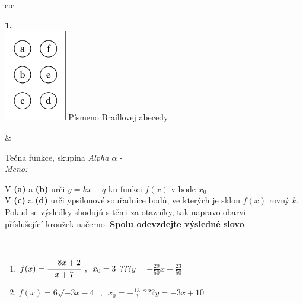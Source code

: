 \documentclass[10pt]{report}
\begin{document}
\begin{tabular}{c:c}
\begin{minipage}[c][104.5mm][t]{0.5\linewidth}
\begin{center}
\begin{minipage}{0.20\linewidth}
\begin{center}
{\Huge\bfseries 1.} \\[2mm]
\includegraphics[height=40mm]{../images/braille.png}
{\small Písmeno Braillovej abecedy}
\end{center}
\end{minipage}
\end{center}
\end{minipage}
&
\begin{minipage}[c][104.5mm][t]{0.5\linewidth}
\begin{center}
\vspace{7mm}
{\huge Tečna funkce, skupina \textit{Alpha $\alpha$} -}\\[5mm]
\textit{Meno:}\phantom{xxxxxxxxxxxxxxxxxxxxxxxxxxxxxxxxxxxxxxxxxxxxxxxxxxxxxxxxxxxxxxxxx}\\[5mm]
\begin{minipage}{0.95\linewidth}
\begin{center}
V \textbf{(a)} a \textbf{(b)} urči  $y = kx + q$ ku funkci $f(x)$ v bode $x_0$.\\V \textbf{(c)} a \textbf{(d)} urči ypsilonové souřadnice bodů, ve kterých je sklon $f(x)$ rovný $k$.\\Pokud se výsledky shodujú s těmi za otazníky, tak napravo obarvi\\příslušející kroužek načerno. \textbf{Spolu odevzdejte výsledné slovo}.
\end{center}
\end{minipage}
\\[1mm]
\begin{minipage}{0.79\linewidth}
\begin{center}
\begin{varwidth}{\linewidth}
\begin{enumerate}
\small
\item $f(x)=\cfrac{-8x+2}{x+7}\enspace , \enspace x_0=3$\quad \dotfill\; ???\;\dotfill \quad $y = -\frac{29}{50}x-\frac{23}{50}$
\item $f(x)=6\sqrt{-3x-4}\enspace , \enspace x_0=-\frac{13}{3}$\quad \dotfill\; ???\;\dotfill \quad $y = -3x+10$

\end{enumerate}
\end{varwidth}
\end{center}
\end{minipage}
\end{center}
\end{minipage}
\end{tabular}
\end{document}
